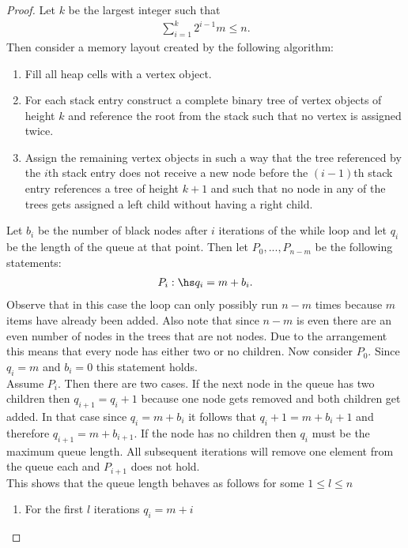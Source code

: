 \documentclass{article}
\begin{document}
\begin{proof}
    Let $k$ be the largest integer such that
    \begin{align*}
        \sum_{i=1}^k 2^{i-1}m \leq n.
    \end{align*}
    Then consider a memory layout created by the following algorithm:
    \begin{enumerate}
        \item Fill all heap cells with a vertex object.
        \item For each stack entry construct a complete binary tree of vertex objects
        of height $k$ and reference the root from the stack such that no vertex is assigned twice.
        \item Assign the remaining vertex objects in such a way that the tree referenced by the $i$th
        stack entry does not receive a new node before the $(i-1)$th stack entry references a tree of height $k+1$
        and such that no node in any of the trees gets assigned a left child without having a right child.
    \end{enumerate}
    Let $b_i$ be the number of black nodes after $i$ iterations of the while loop and let
    $q_i$ be the length of the queue at that point. Then let $P_0,...,P_{n-m}$ be the
    following statements:
    \begin{align*}
        P_i:\hs q_i = m+b_i.
    \end{align*}
    Observe that in this case the loop can only possibly run $n-m$ times because $m$ items have
    already been added. Also note that since $n-m$ is even there are an even number of nodes
    in the trees that are not nodes. Due to the arrangement this means that every node has either
    two or no children. Now consider $P_0$. Since $q_i=m$ and $b_i=0$ this statement holds.\\
    Assume $P_i$. Then there are two cases. If the next node in the queue has two children
    then $q_{i+1} = q_i+1$ because one node gets removed and both children get added. In that
    case since $q_i = m + b_i$ it follows that $q_i + 1 = m + b_i + 1$ and therefore
    $q_{i+1} = m + b_{i+1}$. If the
    node has no children then $q_i$ must be the maximum queue length. All subsequent iterations
    will remove one element from the queue each and $P_{i+1}$ does not hold.\\
    This shows that the queue length behaves as follows for some $1\leq l \leq n$
    \begin{enumerate}
        \item For the first $l$ iterations $q_i = m + i$

\end{enumerate}
\end{proof}
\end{document}
